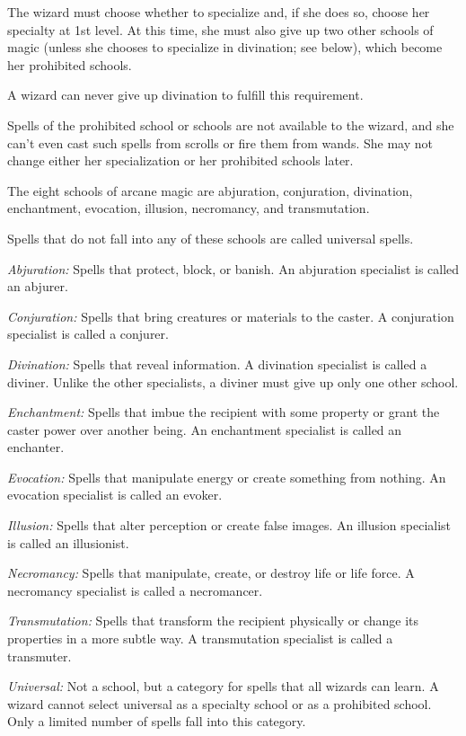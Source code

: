\documentclass{article}
\begin{document}
The wizard must choose whether to specialize and, if she does so, choose her specialty 
at 1st level. At this time, she must also give up two other schools of magic (unless 
she chooses to specialize in divination; see below), which become her prohibited 
schools.

A wizard can never give up divination to fulfill this requirement.

Spells of the prohibited school or schools are not available to the wizard, and 
she can't even cast such spells from scrolls or fire them from wands. She may not 
change either her specialization or her prohibited schools later.

The eight schools of arcane magic are abjuration, conjuration, divination, enchantment, 
evocation, illusion, necromancy, and transmutation.

Spells that do not fall into any of these schools are called universal spells.

\textit{Abjuration: }Spells that protect, block, or banish. An abjuration specialist 
is called an abjurer.

\textit{Conjuration: }Spells that bring creatures or materials to the caster. A 
conjuration specialist is called a conjurer.

\textit{Divination: }Spells that reveal information. A divination specialist is 
called a diviner. Unlike the other specialists, a diviner must give up only one 
other school.

\textit{Enchantment: }Spells that imbue the recipient with some property or grant 
the caster power over another being. An enchantment specialist is called an enchanter.

\textit{Evocation: }Spells that manipulate energy or create something from nothing. 
An evocation specialist is called an evoker.

\textit{Illusion: }Spells that alter perception or create false images. An illusion 
specialist is called an illusionist.

\textit{Necromancy: }Spells that manipulate, create, or destroy life or life force. 
A necromancy specialist is called a necromancer.

\textit{Transmutation: }Spells that transform the recipient physically or change 
its properties in a more subtle way. A transmutation specialist is called a transmuter.

\textit{Universal: }Not a school, but a category for spells that all wizards can 
learn. A wizard cannot select universal as a specialty school or as a prohibited 
school. Only a limited number of spells fall into this category.
\end{document}
